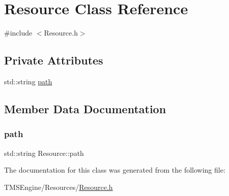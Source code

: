 \hypertarget{class_resource}{}\section{Resource Class Reference}
\label{class_resource}


{\ttfamily \#include $<$Resource.\+h$>$}

\subsection*{Private Attributes}
\begin{DoxyCompactItemize}
\item 
std\+::string \hyperlink{class_resource_a9d2af35bfd103fdc3f82a1bb8733a09d}{path}
\end{DoxyCompactItemize}


\subsection{Member Data Documentation}
\mbox{\label{class_resource_a9d2af35bfd103fdc3f82a1bb8733a09d}} 
\subsubsection{\texorpdfstring{path}{path}}
{\footnotesize\ttfamily std\+::string Resource\+::path\hspace{0.3cm}{\ttfamily [private]}}



The documentation for this class was generated from the following file\+:\begin{DoxyCompactItemize}
\item 
T\+M\+S\+Engine/\+Resources/\hyperlink{_resource_8h}{Resource.\+h}\end{DoxyCompactItemize}
